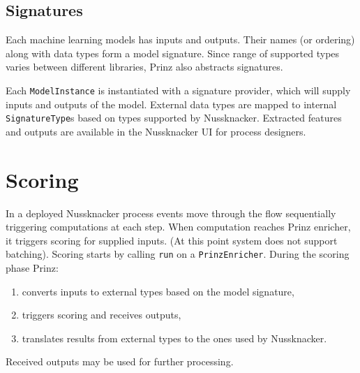 \subsection{Signatures}

Each machine learning models has inputs and outputs.
Their names (or ordering) along with data types form a model signature.
Since range of supported types varies between different libraries, Prinz also abstracts signatures.

Each \texttt{ModelInstance} is instantiated with a signature provider, which will supply inputs and outputs of the model.
External data types are mapped to internal \texttt{SignatureType}s based on types supported by Nussknacker.
Extracted features and outputs are available in the Nussknacker UI for process designers.

\section{Scoring}

In a deployed Nussknacker process events move through the flow sequentially triggering computations at each step.
When computation reaches Prinz enricher, it triggers scoring for supplied inputs.
(At this point system does not support batching).
Scoring starts by calling \texttt{run} on a \texttt{PrinzEnricher}.
During the scoring phase Prinz:
\begin{enumerate}
	\item converts inputs to external types based on the model signature,
	\item triggers scoring and receives outputs,
	\item translates results from external types to the ones used by Nussknacker.
\end{enumerate}
Received outputs may be used for further processing.
